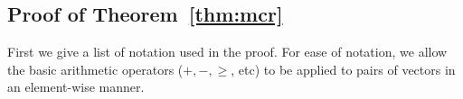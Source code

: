 \documentclass{article}
\begin{document}
\begin{appendices}


\subsection{Proof of Theorem~\ref{thm:mcr}}
First we give a list of notation used in the proof. For ease of notation, we allow the basic arithmetic operators ($+, -, \geq$, etc) to be applied to pairs of vectors in an element-wise manner. 


\end{appendices}
\end{document}
